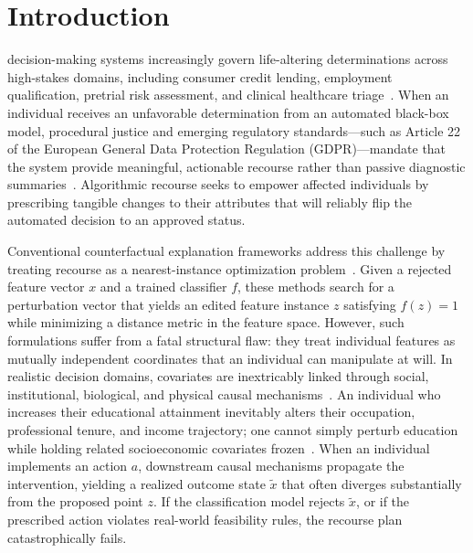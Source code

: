 \documentclass[nolineno]{paper/ieee-access/ieeeaccess}%
\begin{document}
\section{Introduction}
\label{sec:introduction}
 decision-making systems increasingly govern life-altering determinations across high-stakes domains, including consumer credit lending, employment qualification, pretrial risk assessment, and clinical healthcare triage~\cite{karimi2022survey, verma2020counterfactual}. When an individual receives an unfavorable determination from an automated black-box model, procedural justice and emerging regulatory standards---such as Article 22 of the European General Data Protection Regulation (GDPR)---mandate that the system provide meaningful, actionable recourse rather than passive diagnostic summaries~\cite{ustun2019actionable, wachter2017counterfactual, barocas2020hidden}. Algorithmic recourse seeks to empower affected individuals by prescribing tangible changes to their attributes that will reliably flip the automated decision to an approved status.

Conventional counterfactual explanation frameworks address this challenge by treating recourse as a nearest-instance optimization problem~\cite{mothilal2020dice, wachter2017counterfactual}. Given a rejected feature vector $x$ and a trained classifier $f$, these methods search for a perturbation vector that yields an edited feature instance $z$ satisfying $f(z)=1$ while minimizing a distance metric in the feature space. However, such formulations suffer from a fatal structural flaw: they treat individual features as mutually independent coordinates that an individual can manipulate at will. In realistic decision domains, covariates are inextricably linked through social, institutional, biological, and physical causal mechanisms~\cite{karimi2021recourse, karimi2020imperfect}. An individual who increases their educational attainment inevitably alters their occupation, professional tenure, and income trajectory; one cannot simply perturb education while holding related socioeconomic covariates frozen~\cite{pearl2009causality}. When an individual implements an action $a$, downstream causal mechanisms propagate the intervention, yielding a realized outcome state $\widetilde{x}$ that often diverges substantially from the proposed point $z$. If the classification model rejects $\widetilde{x}$, or if the prescribed action violates real-world feasibility rules, the recourse plan catastrophically fails.
\end{document}
